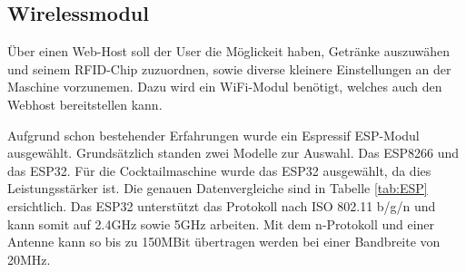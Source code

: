 \subsection{Wirelessmodul}
\label{subsec:Wirelessmodul}

Über einen Web-Host soll der User die Möglickeit haben, Getränke auszuwähen und seinem RFID-Chip zuzuordnen, sowie diverse kleinere Einstellungen an der Maschine vorzunemen. Dazu wird ein WiFi-Modul benötigt, welches auch den Webhost bereitstellen kann.

Aufgrund schon bestehender Erfahrungen wurde ein Espressif ESP-Modul ausgewählt. Grundsätzlich standen zwei Modelle zur Auswahl. Das ESP8266 und das ESP32. Für die Cocktailmaschine wurde das ESP32 ausgewählt, da dies Leistungsstärker ist. Die genauen Datenvergleiche sind in Tabelle \ref{tab:ESP} ersichtlich. Das ESP32 unterstützt das Protokoll nach ISO 802.11 b/g/n und kann somit auf 2.4GHz sowie 5GHz arbeiten. Mit dem n-Protokoll und einer Antenne kann so bis zu 150MBit übertragen werden bei einer Bandbreite von 20MHz.


